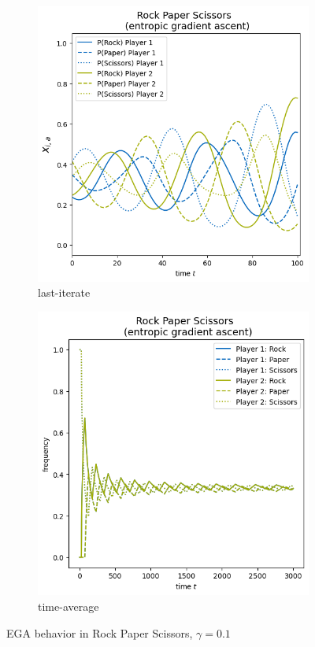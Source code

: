 \begin{figure}[H]
\centering
\begin{subfigure}{.5\textwidth}
    \centering
    \includegraphics[width=\textwidth]{logos/RPS2.png}
    \caption{last-iterate}
    \label{fig:RPSa}
\end{subfigure}%
\begin{subfigure}{.5\textwidth}
    \centering
    \includegraphics[width=\textwidth]{logos/RPS3.png}
    \caption{time-average}
    \label{fig:RPSb}
\end{subfigure}
\caption{EGA behavior in Rock Paper Scissors, $\gamma = 0.1$}
\label{fig:RPS}
\end{figure}


